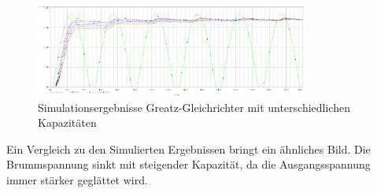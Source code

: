 \begin{figure}[!h]
\begin{center}
\includegraphics[width=0.8\textwidth]{Versuch3-SimulationmitVariablenKondesator}
\caption{Simulationsergebnisse Greatz-Gleichrichter mit unterschiedlichen Kapazit\"aten}
\end{center}
\end{figure}
Ein Vergleich zu den Simulierten Ergebnissen bringt ein \"ahnliches Bild. Die Brummspannung sinkt mit steigender Kapazit\"at, da die Ausgangsspannung immer st\"arker gegl\"attet wird. 
\newpage
